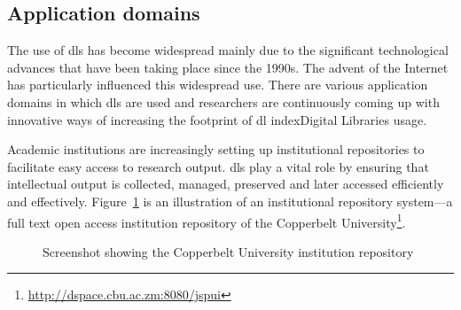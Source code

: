 \subsection{Application domains}
\label{sec:background:digital-libraries:application-domains}

The use of \glspl{dl}  has become widespread mainly due to the significant
technological advances that have been taking place since the 1990s. The advent
of the Internet has particularly influenced this widespread use. There are
various application domains in which \glspl{dl}  are used and researchers
are continuously coming up with innovative ways of increasing the footprint of
\gls{dl} index{Digital Libraries} usage. 

Academic institutions are increasingly setting up institutional repositories to
facilitate easy access to research output. \glspl{dl}  play a vital role
by ensuring that intellectual output is collected, managed, preserved and later
accessed efficiently and effectively. Figure~\ref{fig:background:digital-libraries:zm-cbu-repository} is an illustration of
an institutional repository system---a full text open access institution
repository of the Copperbelt
University\footnote{\url{http://dspace.cbu.ac.zm:8080/jspui}}.

\begin{figure}
 \centering
  \caption{Screenshot showing the Copperbelt University institution repository}
  \label{fig:background:digital-libraries:zm-cbu-repository}
\end{figure}

